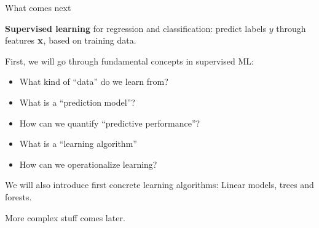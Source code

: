 \documentclass[11pt,compress,t,notes=noshow, xcolor=table]{beamer}
\begin{document}
\begin{framei}{What comes next}
\item \textbf{Supervised learning} for regression and classification: predict labels $y$ through features $\mathbf{x}$, based on training data.
\item First, we will go through fundamental concepts in supervised ML: 
\begin{itemize}
\item What kind of ``data'' do we learn from?
\item What is a ``prediction model''?
\item How can we quantify ``predictive performance''?
\item What is a ``learning algorithm'' 
\item How can we operationalize learning?
\end{itemize}
\item We will also introduce first concrete learning algorithms: Linear models, trees and forests. 
\item More complex stuff comes later.
\end{framei}

\endlecture
\end{document}
